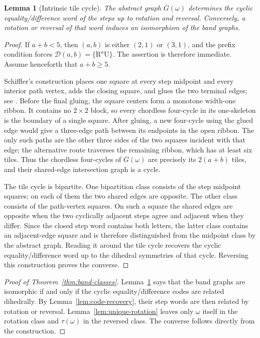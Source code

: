 \documentclass[11pt]{amsart}
\newtheorem{lemma}[theorem]{Lemma}
\theoremstyle{definition}
\newcommand{\RR}{\mathrm{R}}
\newcommand{\UU}{\mathrm{U}}
\newcommand{\cD}{\mathcal D}
\begin{document}
\begin{lemma}[Intrinsic tile cycle]\label{lem:tile-cycle}
The abstract graph $\overline G(\omega)$ determines the cyclic
equality/difference word of the steps up to rotation and reversal.  Conversely,
a rotation or reversal of that word induces an isomorphism of the band graphs.
\end{lemma}

\begin{proof}
If $a+b<5$, then $(a,b)$ is either $(2,1)$ or $(3,1)$, and the prefix
condition forces $\cD(a,b)=\{\RR^a\UU\}$.  The assertion is therefore
immediate.  Assume henceforth that $a+b\geq5$.

Schiffler's construction places one square at every step midpoint and every
interior path vertex, adds the closing square, and glues the two terminal
edges; see \cite{CanakciSchifflerBand,Schiffler}.  Before the final gluing, the
square centers form a monotone width-one ribbon.  It contains no $2\times2$
block, so every chordless four-cycle in its one-skeleton is the boundary of a
single square.  After gluing, a new four-cycle using the glued edge would give
a three-edge path between its endpoints in the open ribbon.  The only such
paths are the other three sides of the two squares incident with that edge;
the alternative route traverses the remaining ribbon, which has at least six
tiles.  Thus the chordless four-cycles of $\overline G(\omega)$ are precisely
its $2(a+b)$ tiles, and their shared-edge intersection graph is a cycle.

The tile cycle is bipartite.  One bipartition class consists of the step
midpoint squares; on each of them the two shared edges are opposite.  The other
class consists of the path-vertex squares.  On such a square the shared edges
are opposite when the two cyclically adjacent steps agree and adjacent when
they differ.  Since the closed step word contains both letters, the latter
class contains an adjacent-edge square and is therefore distinguished from the
midpoint class by the abstract graph.  Reading it around the tile cycle
recovers the cyclic equality/difference word up to the dihedral symmetries of
that cycle.  Reversing this construction proves the converse.
\end{proof}

\begin{proof}[Proof of Theorem~\ref{thm:band-classes}]
 Lemma~\ref{lem:tile-cycle} says that the band graphs are isomorphic if and only
 if the cyclic equality/difference codes are related dihedrally.  By
 Lemma~\ref{lem:code-recovery}, their step words are then related by rotation
or reversal.  Lemma~\ref{lem:unique-rotation} leaves only $\omega$ itself in
the rotation class and $\tau(\omega)$ in the reversed class.  The converse
follows directly from the construction.
\end{proof}
\end{document}
